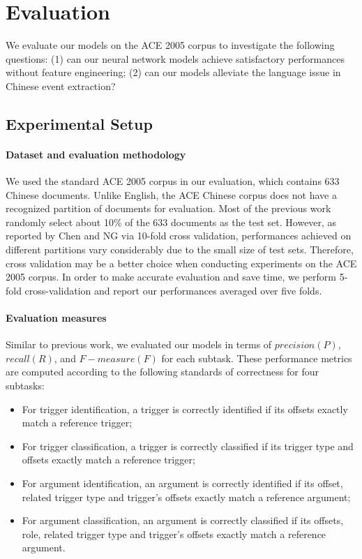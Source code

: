 \section{Evaluation}\label{experiments}
We evaluate our models on the ACE 2005 corpus to investigate the following questions: (1) can our neural network models achieve
satisfactory performances without feature engineering; (2) can our models alleviate the language issue in Chinese event extraction?

\subsection{Experimental Setup}
\paragraph{Dataset and evaluation methodology}
We used the standard ACE 2005 corpus in our evaluation, which contains 633 Chinese documents. Unlike English, the ACE Chinese corpus does not have a recognized partition of documents for evaluation. Most of the previous work \cite{chen2009language,feng2016language} randomly select about 10\% of the 633 documents as the test set. However, as reported by Chen and NG  via 10-fold cross validation, performances achieved on different partitions vary considerably due to the small size of test sets. Therefore, cross validation may be a better choice when conducting experiments on the ACE 2005 corpus. In order to make accurate evaluation and save time, we perform 5-fold cross-validation and report our performances averaged over five folds.

\paragraph{Evaluation measures} Similar to previous work, we evaluated our models in terms of $precision (P)$, $recall (R)$, and $F{-}measure (F)$ for each subtask. These performance metrics are computed according to the following standards of correctness for four subtasks:
\begin{itemize}	
	\item For trigger identification, a trigger is correctly identified if its offsets exactly match a reference trigger;
	\item For trigger classification, a trigger is correctly classified if its trigger type and offsets exactly match a reference trigger;
	\item For argument identification, an argument is correctly identified if its offset, related trigger type and trigger’s offsets exactly match a reference argument;
	\item For argument classification, an argument is correctly classified if its offsets, role, related trigger type and trigger’s offsets exactly match a reference argument.
\end{itemize}

